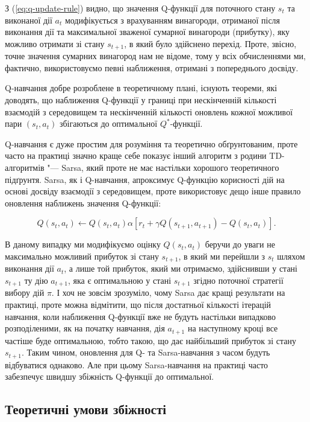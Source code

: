 \documentclass[a4paper,10pt,fleqn]{article}
\begin{document}
З (\ref{eq:q-update-rule}) видно, що значення Q-функції для поточного стану $s_t$ та виконаної дії $a_t$ модифікується з врахуванням винагороди, отриманої після виконання дії та максимальної зваженої сумарної винагороди (прибутку), яку можливо отримати зі стану $s_{t+1}$, в який було здійснено перехід. Проте, звісно, точне значення сумарних винагород нам не відоме, тому у всіх обчисленнями ми, фактично, використовуємо певні наближення, отримані з попереднього досвіду. 

Q-навчання добре розроблене в теоретичному плані, існують теореми, які доводять, що наближення Q-функції у границі при нескінченній кількості взаємодій з середовищем та нескінченній кількості оновлень кожної можливої пари $(s_t,a_t)$ збігаються до оптимальної $Q^*$-функції. 

Q-навчання є дуже простим для розуміння та теоретично обґрунтованим, проте часто на практиці значно краще себе показує інший алгоритм з родини TD-алгоритмів "--- Sarsa, який проте не має настільки хорошого теоретичного підґрунтя.  Sarsa, як і Q-навчання, апроксимує Q-функцію корисності дій на основі досвіду взаємодії з середовищем, проте використовує дещо інше правило оновлення наближень значення Q-функції:

\begin{equation}
Q(s_t,a_t) \leftarrow Q(s_t,a_t)  \alpha \left[ r_t + \gamma Q(s_{t+1}, a_{t+1}) - Q(s_t, a_t) \right].
\end{equation}

В даному випадку ми модифікуємо оцінку $Q(s_t,a_t)$ беручи до уваги не максимально можливий прибуток зі стану $s_{t+1}$, в який ми перейшли з $s_t$ шляхом виконання дії $a_t$, а лише той прибуток, який ми отримаємо, здійснивши у стані $s_{t+1}$ ту дію $a_{t+1}$, яка є оптимальною у стані $s_{t+1}$ згідно поточної стратегії вибору дій $\pi$. І хоч не зовсім зрозуміло, чому Sarsa дає кращі результати на практиці, проте можна відмітити, що після достатньої кількості ітерацій навчання, коли наближення Q-функції вже не будуть настільки випадково розподіленими, як на початку навчання, дія $a_{t+1}$ на наступному кроці все частіше буде оптимальною, тобто такою, що дає найбільший прибуток зі стану $s_{t+1}$. Таким чином, оновлення для Q- та Sarsa-навчання з часом будуть відбуватися однаково. Але при цьому Sarsa-навчання на практиці часто забезпечує швидшу збіжність Q-функції до оптимальної.

\subsection{Теоретичні умови збіжності}
\end{document}
